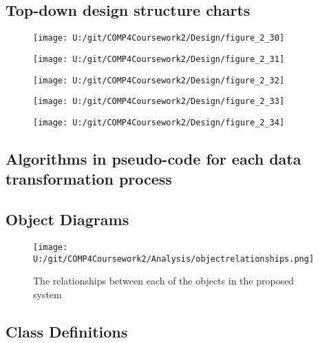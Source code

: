 \subsection{Top-down design structure charts}

\begin{figure}[H]
    \label{fig:print_function_result}\caption{}
    \texttt{[image: U:/git/COMP4Coursework2/Design/figure\_2\_30]}
\end{figure}

\begin{figure}[H]
    \label{fig:print_function_result}\caption{}
    \texttt{[image: U:/git/COMP4Coursework2/Design/figure\_2\_31]}
\end{figure}

\begin{figure}[H]
    \label{fig:print_function_result}\caption{}
    \texttt{[image: U:/git/COMP4Coursework2/Design/figure\_2\_32]}
\end{figure}

\begin{figure}[H]
    \label{fig:print_function_result}\caption{}
    \texttt{[image: U:/git/COMP4Coursework2/Design/figure\_2\_33]}
\end{figure}

\begin{figure}[H]
    \label{fig:print_function_result}\caption{}
    \texttt{[image: U:/git/COMP4Coursework2/Design/figure\_2\_34]}
\end{figure}

\subsection{Algorithms in pseudo-code for each data transformation process}

\subsection{Object Diagrams}

\begin{figure}[H]
    \texttt{[image: U:/git/COMP4Coursework2/Analysis/objectrelationships.png]}
    \caption{The relationships between each of the objects in the proposed system} \label{fig:print_function_result}
\end{figure}

\subsection{Class Definitions}

